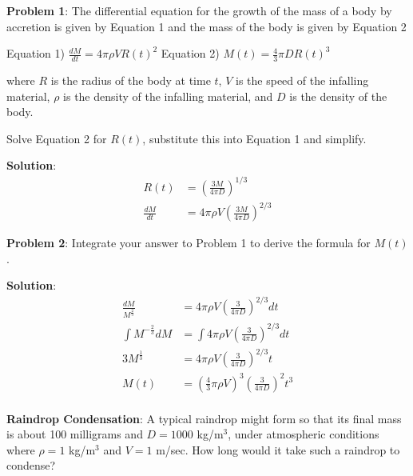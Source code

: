 \documentclass[12pt]{article}
\begin{document}

\bigskip

\textbf{Problem 1}: The differential equation for the growth of the mass of a body by accretion is given by Equation 1 and the mass of the body is given by Equation 2

\medskip

Equation 1) $\frac{dM}{dt} = 4 \pi \rho V R(t)^2$ \qquad Equation 2) $M(t) = \frac{4}{3} \pi D R(t)^3$

\medskip

where $R$ is the radius of the body at time $t$, $V$ is the speed of the infalling material, $\rho$ is the density of the infalling material, and $D$ is the density of the body.

\medskip

Solve Equation 2 for $R(t)$, substitute this into Equation 1 and simplify.

\medskip

\textbf{Solution}:  
\begin{align}
R(t) &= \left(\frac{3 M}{4 \pi D}\right)^{1/3} \\
\frac{dM}{dt} &= 4 \pi \rho V \left(\frac{3M}{4 \pi D}\right)^{2/3}
\end{align}

\medskip

\textbf{Problem 2}:  Integrate your answer to Problem 1 to derive the formula for $M(t)$.

\medskip

\textbf{Solution}: 
\begin{align}
\frac{dM}{M^{\frac{2}{3}}} &= 4 \pi \rho V \left(\frac{3}{4 \pi D}\right)^{2/3} dt \\
\int M^{-\frac{2}{3}} dM &= \int 4 \pi \rho V \left(\frac{3}{4 \pi D}\right)^{2/3} dt \\
3M^{\frac{1}{3}} &= 4 \pi \rho V \left(\frac{3}{4 \pi D}\right)^{2/3} t \\
M(t) &= \left(\frac{4}{3} \pi \rho V\right)^3 \left(\frac{3}{4 \pi D}\right)^2 t^3 \\
\end{align}

\clearpage

\textbf{Raindrop Condensation}:  A typical raindrop might form so that its final mass is about 100 milligrams and $D = 1000$ kg/m$^3$, under atmospheric conditions where $\rho = 1$ kg/m$^3$ and $V = 1$ m/sec. How long would it take such a raindrop to condense?
\end{document}
